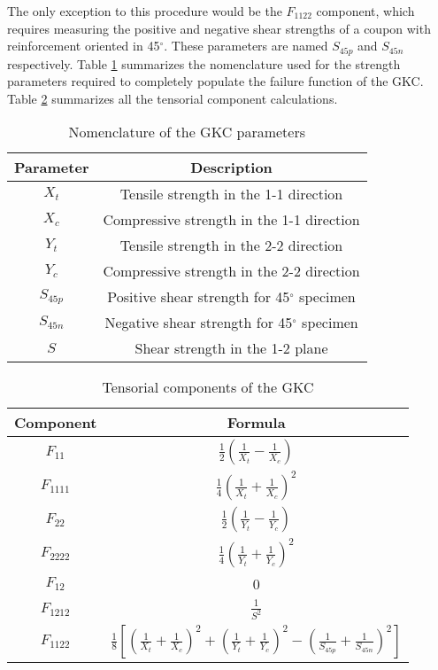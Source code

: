\documentclass[main.tex]{subfiles}
\begin{document}
The only exception to this procedure would be the $F_{1122}$ component, which requires measuring the positive and negative shear strengths of a coupon with reinforcement oriented in 45$^\circ$. These parameters are named $S_{45p}$ and $S_{45n}$ respectively. Table \ref{tab:GKparam} summarizes the nomenclature used for the strength parameters required to completely populate the failure function of the GKC. Table \ref{tab:GKtens} summarizes all the tensorial component calculations.

\begin{table} [h]
	\centering
	\caption{Nomenclature of the GKC parameters}
	\begin{tabular}{ c c }
		\toprule
		\textbf{Parameter} & \textbf{Description} \\ 
		\midrule
		$X_t$ & Tensile strength in the 1-1 direction\\
		$X_c$ & Compressive strength in the 1-1 direction\\
		$Y_t$ & Tensile strength in the 2-2 direction\\
		$Y_c$ & Compressive strength in the 2-2 direction\\
		$S_{45p}$ & Positive shear strength for 45$^\circ$ specimen\\
		$S_{45n}$ & Negative shear strength for 45$^\circ$ specimen\\
		$S$ & Shear strength in the 1-2 plane\\
		\bottomrule
	\end{tabular}
	\label{tab:GKparam}
\end{table}

\begin{table} [h]
	\centering
	\caption{Tensorial components of the GKC}
	\begin{tabular}{ c c } 
		\toprule
		\textbf{Component} & \textbf{Formula} \\
		\midrule
		$F_{11}$ & $\frac{1}{2}(\frac{1}{X_t}-\frac{1}{X_c})$\\ [1ex]
		$F_{1111}$ & $\frac{1}{4}(\frac{1}{X_t}+\frac{1}{X_c})^2$\\ [1ex]
		$F_{22}$ & $\frac{1}{2}(\frac{1}{Y_t}-\frac{1}{Y_c})$\\ [1ex]
		$F_{2222}$ & $\frac{1}{4}(\frac{1}{Y_t}+\frac{1}{Y_c})^2$\\ [1ex]
		$F_{12}$ & 0\\ [1ex]
		$F_{1212}$ & $\frac{1}{S^2}$\\ [1ex]
		$F_{1122}$ & $\frac{1}{8}[(\frac{1}{X_t}+\frac{1}{X_c})^2+(\frac{1}{Y_t}+\frac{1}{Y_c})^2-(\frac{1}{S_{45p}}+\frac{1}{S_{45n}})^2]$\\ [1ex]
		\bottomrule
	\end{tabular}
	\label{tab:GKtens}
\end{table}
\end{document}
